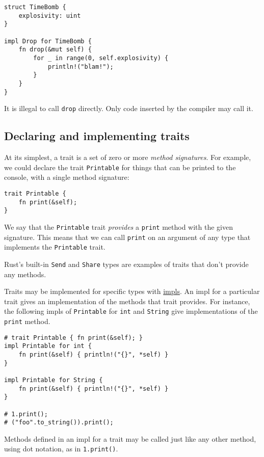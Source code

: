 \documentclass[]{article}
\begin{document}
\begin{verbatim}
struct TimeBomb {
    explosivity: uint
}

impl Drop for TimeBomb {
    fn drop(&mut self) {
        for _ in range(0, self.explosivity) {
            println!("blam!");
        }
    }
}
\end{verbatim}

It is illegal to call \texttt{drop} directly. Only code inserted by the
compiler may call it.

\subsection{Declaring and implementing
traits}\label{declaring-and-implementing-traits}

At its simplest, a trait is a set of zero or more \emph{method
signatures}. For example, we could declare the trait \texttt{Printable}
for things that can be printed to the console, with a single method
signature:

\begin{verbatim}
trait Printable {
    fn print(&self);
}
\end{verbatim}

We say that the \texttt{Printable} trait \emph{provides} a
\texttt{print} method with the given signature. This means that we can
call \texttt{print} on an argument of any type that implements the
\texttt{Printable} trait.

Rust's built-in \texttt{Send} and \texttt{Share} types are examples of
traits that don't provide any methods.

Traits may be implemented for specific types with
\hyperref[methods]{impls}. An impl for a particular trait gives an
implementation of the methods that trait provides. For instance, the
following impls of \texttt{Printable} for \texttt{int} and
\texttt{String} give implementations of the \texttt{print} method.

\begin{verbatim}
# trait Printable { fn print(&self); }
impl Printable for int {
    fn print(&self) { println!("{}", *self) }
}

impl Printable for String {
    fn print(&self) { println!("{}", *self) }
}

# 1.print();
# ("foo".to_string()).print();
\end{verbatim}

Methods defined in an impl for a trait may be called just like any other
method, using dot notation, as in \texttt{1.print()}.
\end{document}
